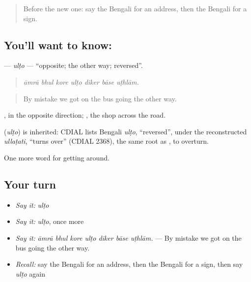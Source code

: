 \label{lesson:BN-C400-ulto}



\begin{quote}
Before the new one: say the Bengali for an address, then the Bengali for a sign.
\end{quote}

\subsection*{You'll want to know: }
\textbf{} — \emph{ulṭo} — \textquotedblleft{}opposite; the other way; reversed\textquotedblright{}.

\begin{quote}
      
\end{quote}

\begin{quote}
\emph{āmrā bhul kore ulṭo diker bāse uṭhlām.}
\end{quote}

\begin{quote}
By mistake we got on the bus going the other way.
\end{quote}

 , in the opposite direction;   , the shop across the road.

\begin{cousinweb}
\textbf{} (\emph{ulṭo}) is inherited: CDIAL lists Bengali \emph{ulṭo}, \textquotedblleft{}reversed\textquotedblright{}, under the reconstructed \emph{ullaṭati}, \textquotedblleft{}turns over\textquotedblright{} (CDIAL 2368), the same root as , to overturn.
\end{cousinweb}

\begin{grammarlens}[title={What you've built}]
One more word for getting around.
\end{grammarlens}

\subsection*{Your turn}
\begin{itemize}
\raggedright
  \item \emph{Say it:} \emph{ulṭo}
  \item \emph{Say it:} \emph{ulṭo}, once more
  \item \emph{Say it:} \emph{āmrā bhul kore ulṭo diker bāse uṭhlām.} — By mistake we got on the bus going the other way.
  \item \emph{Recall:} say the Bengali for an address, then the Bengali for a sign, then say \emph{ulṭo} again
\end{itemize}

